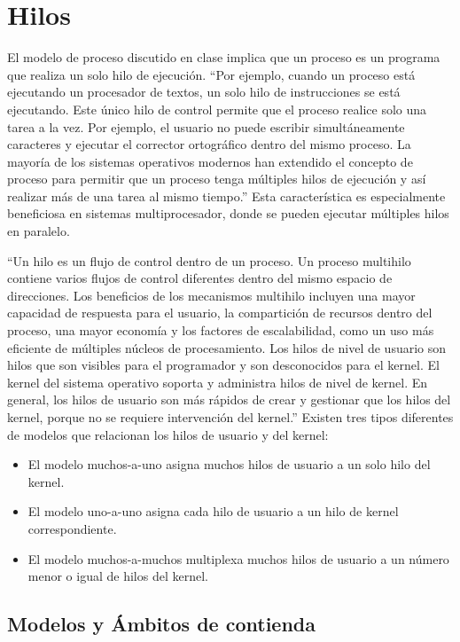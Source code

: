 \section{Hilos}
El modelo de proceso discutido en clase implica que un proceso es un programa que realiza un 
solo hilo de ejecución. ``Por ejemplo, cuando un proceso está ejecutando un procesador 
de textos, un solo hilo de instrucciones se está ejecutando. Este único hilo de control permite 
que el proceso realice solo una tarea a la vez. Por ejemplo, el usuario no puede escribir simultáneamente 
caracteres y ejecutar el corrector ortográfico dentro del mismo proceso. 
La mayoría de los sistemas operativos modernos han extendido el concepto de proceso para 
permitir que un proceso tenga múltiples hilos de ejecución y así realizar más de una tarea 
al mismo tiempo.'' Esta característica es especialmente beneficiosa en sistemas multiprocesador, 
donde se pueden ejecutar múltiples hilos en paralelo.\cite{silberschatz}

``Un hilo es un flujo de control dentro de un proceso. Un proceso multihilo contiene varios 
flujos de control diferentes dentro del mismo espacio de direcciones.
Los beneficios de los mecanismos multihilo incluyen una mayor capacidad de respuesta para 
el usuario, la compartición de recursos dentro del proceso, una mayor economía y los factores 
de escalabilidad, como un uso más eficiente de múltiples núcleos de procesamiento.
Los hilos de nivel de usuario son hilos que son visibles para el programador y son desconocidos
para el kernel. El kernel del sistema operativo soporta y administra hilos de nivel de kernel. 
En general, los hilos de usuario son más rápidos de crear y gestionar que los hilos del kernel, 
porque no se requiere intervención del kernel.''\cite{silberschatz}
Existen tres tipos diferentes de modelos que relacionan los hilos de usuario y del kernel:
\begin{itemize}
	\item El modelo muchos-a-uno asigna muchos hilos de usuario a un solo hilo del kernel. 
	\item El modelo uno-a-uno asigna cada hilo de usuario a un hilo de kernel correspondiente.
	\item El modelo muchos-a-muchos multiplexa muchos hilos de usuario a un número menor o igual de hilos del kernel.
\end{itemize}

\subsection{Modelos y Ámbitos de contienda}

